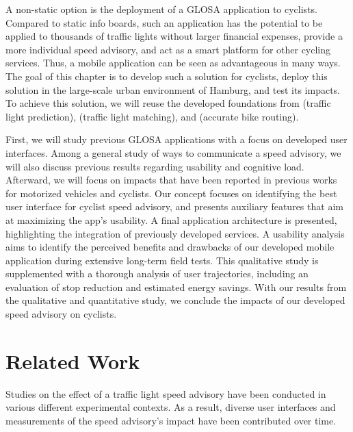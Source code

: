 A non-static option is the deployment of a GLOSA application to cyclists. Compared to static info boards, such an application has the potential to be applied to thousands of traffic lights without larger financial expenses, provide a more individual speed advisory, and act as a smart platform for other cycling services. Thus, a mobile application can be seen as advantageous in many ways. The goal of this chapter is to develop such a solution for cyclists, deploy this solution in the large-scale urban environment of Hamburg, and test its impacts. To achieve this solution, we will reuse the developed foundations from  (traffic light prediction),  (traffic light matching), and  (accurate bike routing).

First, we will study previous GLOSA applications with a focus on developed user interfaces. Among a general study of ways to communicate a speed advisory, we will also discuss previous results regarding usability and cognitive load. Afterward, we will focus on impacts that have been reported in previous works for motorized vehicles and cyclists. Our concept focuses on identifying the best user interface for cyclist speed advisory, and presents auxiliary features that aim at maximizing the app's usability. A final application architecture is presented, highlighting the integration of previously developed services. A usability analysis aims to identify the perceived benefits and drawbacks of our developed mobile application during extensive long-term field tests. This qualitative study is supplemented with a thorough analysis of user trajectories, including an evaluation of stop reduction and estimated energy savings. With our results from the qualitative and quantitative study, we conclude the impacts of our developed speed advisory on cyclists. 

\section{Related Work}\label{sec:rw-uis}

Studies on the effect of a traffic light speed advisory have been conducted in various different experimental contexts. As a result, diverse user interfaces and measurements of the speed advisory's impact have been contributed over time. 


